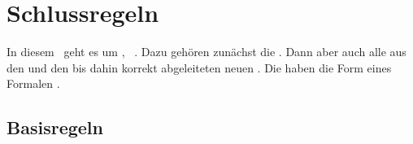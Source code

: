 \section{Schlussregeln}%
\label{sec:Schlussregeln}

In diesem \sectionname\ geht es um , \textdh\ .
Dazu gehören zunächst die .
Dann aber auch alle aus den  und den bis dahin  korrekt abgeleiteten neuen .
Die  haben die Form eines Formalen \Satzes.

\subsection{Basisregeln}%
\label{sub:Basisregeln}

